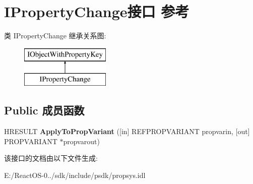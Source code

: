 \hypertarget{interface_i_property_change}{}\section{I\+Property\+Change接口 参考}
\label{interface_i_property_change}
类 I\+Property\+Change 继承关系图\+:\begin{figure}[H]
\begin{center}
\leavevmode
\includegraphics[height=2.000000cm]{interface_i_property_change}
\end{center}
\end{figure}
\subsection*{Public 成员函数}
\begin{DoxyCompactItemize}
\item 
\mbox{\label{interface_i_property_change_a6bbfe3597e37593f5d43d933557aeef9}} 
H\+R\+E\+S\+U\+LT {\bfseries Apply\+To\+Prop\+Variant} (\mbox{[}in\mbox{]} R\+E\+F\+P\+R\+O\+P\+V\+A\+R\+I\+A\+NT propvarin, \mbox{[}out\mbox{]} P\+R\+O\+P\+V\+A\+R\+I\+A\+NT $\ast$propvarout)
\end{DoxyCompactItemize}


该接口的文档由以下文件生成\+:\begin{DoxyCompactItemize}
\item 
E\+:/\+React\+O\+S-\/0../sdk/include/psdk/propsys.\+idl\end{DoxyCompactItemize}
